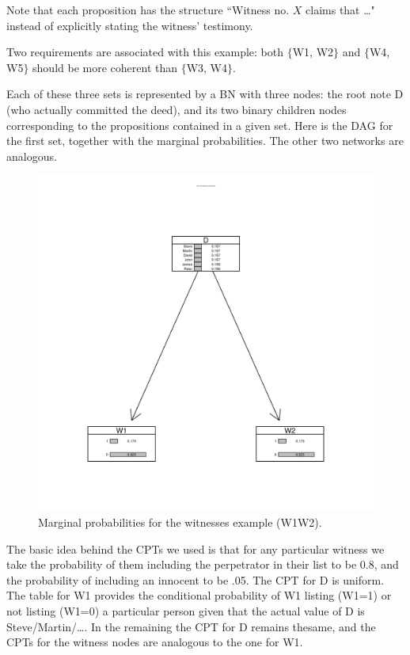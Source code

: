 \documentclass[10pt,]{scrartcl}
\begin{document}
Note that  each proposition has the structure ``Witness no.
\(X\) claims that \dots" instead of explicitly stating the witness'
testimony.

Two requirements are associated with this example: both
\(\{\)\textsf{W1, W2}\(\}\) and \(\{\)\textsf{W4, W5}\(\}\) should be
more coherent than \(\{\)\textsf{W3, W4}\(\}\).

Each of these three sets is represented by a BN with three nodes: the root note \textsf{D} (who actually committed the deed), and its two binary children nodes corresponding to the propositions contained in a given set. Here is the DAG for the first set, together with the marginal probabilities. The other two networks are analogous.

\begin{figure}[h]
\hspace{10mm}
\includegraphics[width =12cm]{w1w2BN.png}
\caption{Marginal probabilities for the witnesses example (W1W2).}
\label{fig:BeatlesBN2}
\end{figure}




The basic idea behind
the CPTs we used is that for any particular witness we take the
probability of them including the perpetrator in their list to be 0.8,
and the probability of including an innocent to be .05.  
The CPT for \textsf{D} is uniform. The table for \textsf{W1} provides
the conditional probability of \textsf{W1} listing (\textsf{W1}=1) or
not listing (\textsf{W1}=0) a particular person given that the actual
value of \textsf{D} is Steve/Martin/\dots.  In the
remaining  the CPT for \textsf{D} remains thesame, and the CPTs for the witness nodes are analogous to the one for \textsf{W1}. 
\end{document}
